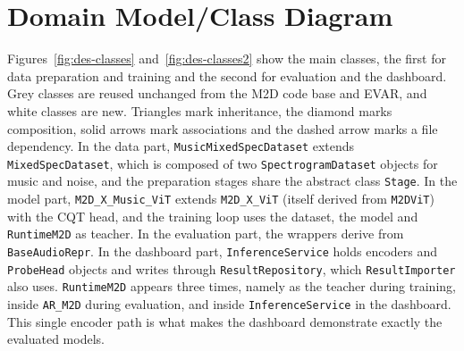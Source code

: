 \documentclass{FastFyp}
\begin{document}
\section{Domain Model/Class Diagram}
\label{sec:des-classes}
{\sloppy Figures~\ref{fig:des-classes} and~\ref{fig:des-classes2} show the main classes, the first for data preparation and training and the second for evaluation and the dashboard. Grey classes are reused unchanged from the M2D code base and EVAR, and white classes are new. Triangles mark inheritance, the diamond marks composition, solid arrows mark associations and the dashed arrow marks a file dependency. In the data part, \texttt{MusicMixedSpecDataset} extends \texttt{MixedSpecDataset}, which is composed of two \texttt{SpectrogramDataset} objects for music and noise, and the preparation stages share the abstract class \texttt{Stage}. In the model part, \texttt{M2D\_X\_Music\_ViT} extends \texttt{M2D\_X\_ViT} (itself derived from \texttt{M2DViT}) with the CQT head, and the training loop uses the dataset, the model and \texttt{RuntimeM2D} as teacher. In the evaluation part, the wrappers derive from \texttt{BaseAudioRepr}. In the dashboard part, \texttt{InferenceService} holds encoders and \texttt{ProbeHead} objects and writes through \texttt{ResultRepository}, which \texttt{ResultImporter} also uses. \texttt{RuntimeM2D} appears three times, namely as the teacher during training, inside \texttt{AR\_M2D} during evaluation, and inside \texttt{InferenceService} in the dashboard. This single encoder path is what makes the dashboard demonstrate exactly the evaluated models.\par}
\end{document}
